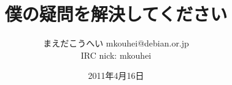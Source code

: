 




\documentclass[cjk,dvipdfmx,12pt]{beamer}
\usepackage{monthlypresentation}



\title{僕の疑問を解決してください}
\author{まえだこうへい mkouhei@debian.or.jp\\IRC nick: mkouhei}
\date{2011年4月16日}



